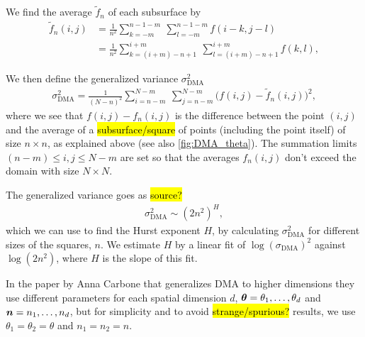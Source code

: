 We find the average $\tilde f_n$ of each subsurface by\footnotemark%
%
%
%
\begin{align}
    \tilde f_n(i,j) 
    &= \frac{1}{n^2}\sum_{k=-m}^{n-1-m} ~ \sum_{l=-m}^{n-1-m} f(i-k, j-l) \label{eq:carbone_average}\\
    &= \frac{1}{n^2} \sum_{k=(i+m)-n+1}^{i+m} ~ \sum_{l=(i+m)-n+1}^{i+m} f(k, l), \label{eq:carbone_average_rewritten}
\end{align}

We then define the generalized variance $\sigma_\text{DMA}^2$
\begin{align}
    \sigma_\text{DMA}^2 
    = \frac{1}{(N-n)^2}\sum_{i=n-m}^{N-m} ~ \sum_{j=n-m}^{N-m} 
    \big(
        f(i,j) - \tilde f_n(i,j)
    \big)^2, \label{eq:dma_variance}
\end{align}
where we see that $f(i,j) - f_n(i,j)$ is the difference between the point $(i,j)$ and the average of a \hl{subsurface/square} of points (including the point itself) of size $n \times n$, as explained above (see also \cref{fig:DMA_theta}).
The summation limits $(n-m) \leq i,j \leq N-m$ are set so that the averages $f_n(i,j)$ don't exceed the domain with size $N \times N$.

The generalized variance goes as \hl{source?}
\begin{align*}
    \sigma_\text{DMA}^2 \sim \left(2n^2\right)^H,
\end{align*}
which we can use to find the Hurst exponent $H$, by calculating $\sigma_\text{DMA}^2$ for different sizes of the squares, $n$. We estimate $H$ by a linear fit of $\log \left(\sigma_\text{DMA}\right)^2$ against $\log \left(2n^2 \right)$, where $H$ is the slope of this fit.

In the paper by Anna Carbone that generalizes DMA to higher dimensions\cite{carbone2007algorithm} they use different parameters for each spatial dimension $d$, $\boldsymbol{\theta} = \theta_1, \dots, \theta_d$ and $\boldsymbol{n} = n_1, \dots, n_d$, but for simplicity and to avoid \hl{strange/spurious?} results, we use $\theta_1 = \theta_2 = \theta$ and $n_1 = n_2 = n$.

